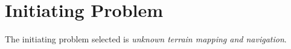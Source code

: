 \section{Initiating Problem}
The initiating problem selected is \textit{unknown terrain mapping and navigation}.